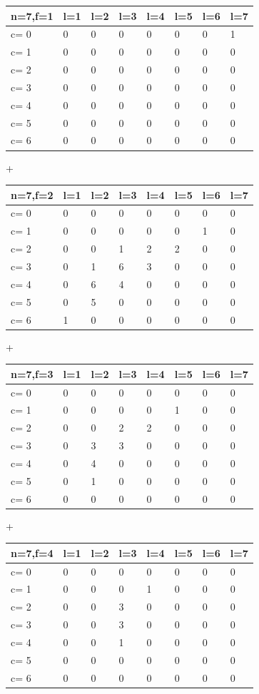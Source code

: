 \begin{tabular}{l | l l l l l l l}
\hline
n=7,f=1&l=1&l=2&l=3&l=4&l=5&l=6&l=7\\
\hline
c= 0& 0& 0& 0& 0& 0& 0& 1\\
c= 1& 0& 0& 0& 0& 0& 0& 0\\
c= 2& 0& 0& 0& 0& 0& 0& 0\\
c= 3& 0& 0& 0& 0& 0& 0& 0\\
c= 4& 0& 0& 0& 0& 0& 0& 0\\
c= 5& 0& 0& 0& 0& 0& 0& 0\\
c= 6& 0& 0& 0& 0& 0& 0& 0\\
\hline
\end{tabular}
+
\begin{tabular}{l | l l l l l l l}
\hline
n=7,f=2&l=1&l=2&l=3&l=4&l=5&l=6&l=7\\
\hline
c= 0& 0& 0& 0& 0& 0& 0& 0\\
c= 1& 0& 0& 0& 0& 0& 1& 0\\
c= 2& 0& 0& 1& 2& 2& 0& 0\\
c= 3& 0& 1& 6& 3& 0& 0& 0\\
c= 4& 0& 6& 4& 0& 0& 0& 0\\
c= 5& 0& 5& 0& 0& 0& 0& 0\\
c= 6& 1& 0& 0& 0& 0& 0& 0\\
\hline
\end{tabular}
+
\begin{tabular}{l | l l l l l l l}
\hline
n=7,f=3&l=1&l=2&l=3&l=4&l=5&l=6&l=7\\
\hline
c= 0& 0& 0& 0& 0& 0& 0& 0\\
c= 1& 0& 0& 0& 0& 1& 0& 0\\
c= 2& 0& 0& 2& 2& 0& 0& 0\\
c= 3& 0& 3& 3& 0& 0& 0& 0\\
c= 4& 0& 4& 0& 0& 0& 0& 0\\
c= 5& 0& 1& 0& 0& 0& 0& 0\\
c= 6& 0& 0& 0& 0& 0& 0& 0\\
\hline
\end{tabular}
+\begin{tabular}{l | l l l l l l l}
\hline
n=7,f=4&l=1&l=2&l=3&l=4&l=5&l=6&l=7\\
\hline
c= 0& 0& 0& 0& 0& 0& 0& 0\\
c= 1& 0& 0& 0& 1& 0& 0& 0\\
c= 2& 0& 0& 3& 0& 0& 0& 0\\
c= 3& 0& 0& 3& 0& 0& 0& 0\\
c= 4& 0& 0& 1& 0& 0& 0& 0\\
c= 5& 0& 0& 0& 0& 0& 0& 0\\
c= 6& 0& 0& 0& 0& 0& 0& 0\\
\hline
\end{tabular}
